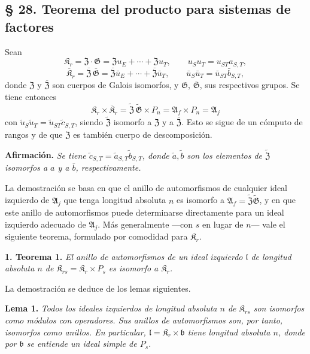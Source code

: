 \subsection*{§ 28. Teorema del producto para sistemas de factores}\label{produktsatz-fuer-faktorensysteme}

Sean
\[
\mathfrak K_r=\mathfrak Z\cdot\mathfrak G
=\mathfrak Zu_E+\cdots+\mathfrak Zu_T,
\qquad u_Su_T=u_{ST}a_{S,T},
\]
\[
\overline{\mathfrak K}_r
=\overline{\mathfrak Z}\,\overline{\mathfrak G}
=\overline{\mathfrak Z}\bar u_E+\cdots+\overline{\mathfrak Z}\bar u_T,
\qquad
\bar u_S\bar u_T=\bar u_{ST}\bar b_{S,T},
\]
donde \(\mathfrak Z\) y \(\overline{\mathfrak Z}\) son cuerpos de Galois isomorfos, y \(\mathfrak G\), \(\overline{\mathfrak G}\), sus respectivos grupos. Se tiene entonces
\[
\mathfrak K_r\times\overline{\mathfrak K}_r
=\widetilde{\mathfrak Z}\,\widetilde{\mathfrak G}\times P_n
=\mathfrak A_f\times P_n
=\mathfrak A_j
\]
con \(\tilde u_S\tilde u_T=\tilde u_{ST}\tilde c_{S,T}\), siendo \(\widetilde{\mathfrak Z}\) isomorfo a \(\mathfrak Z\) y a \(\overline{\mathfrak Z}\). Esto se sigue de un cómputo de rangos y de que \(\mathfrak Z\) es también cuerpo de descomposición.

\noindent\textbf{Afirmación.} \emph{Se tiene \(\tilde c_{S,T}=\tilde a_{S,T}\tilde b_{S,T}\), donde \(\tilde a,\tilde b\) son los elementos de \(\widetilde{\mathfrak Z}\) isomorfos a \(a\) y a \(\bar b\), respectivamente.}

La demostración se basa en que el anillo de automorfismos de cualquier ideal izquierdo de \(\mathfrak A_j\) que tenga longitud absoluta \(n\) es isomorfo a \(\mathfrak A_f=\widetilde{\mathfrak Z}\widetilde{\mathfrak G}\), y en que este anillo de automorfismos puede determinarse directamente para un ideal izquierdo adecuado de \(\mathfrak A_j\). Más generalmente ---con \(s\) en lugar de \(n\)--- vale el siguiente teorema, formulado por comodidad para \(\mathfrak K_r\).

\noindent\textbf{1. Teorema 1.} \emph{El anillo de automorfismos de un ideal izquierdo \(\mathfrak l\) de longitud absoluta \(n\) de \(\mathfrak K_{rs}=\mathfrak K_r\times P_s\) es isomorfo a \(\mathfrak K_r\).}

La demostración se deduce de los lemas siguientes.

\noindent\textbf{Lema 1.} \emph{Todos los ideales izquierdos de longitud absoluta \(n\) de \(\mathfrak K_{rs}\) son isomorfos como módulos con operadores. Sus anillos de automorfismos son, por tanto, isomorfos como anillos. En particular, \(\mathfrak l=\mathfrak K_r\times\mathfrak b\) tiene longitud absoluta \(n\), donde por \(\mathfrak b\) se entiende un ideal simple de \(P_s\).}

